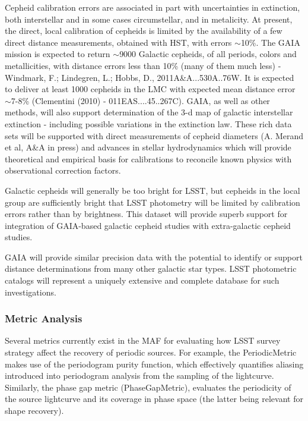 Cepheid calibration errors are associated in part with uncertainties in
extinction, both interstellar and in some cases circumstellar, and in
metalicity.  At present, the direct, local calibration of cepheids is limited
by the availability of a few direct distance measurements, obtained with HST,
with errors $\sim$10\%.  The GAIA mission is expected to return $\sim$9000
Galactic cepheids, of all periods, colors and metallicities, with distance
errors less than 10\% (many of them much less) - Windmark, F.; Lindegren, L.;
Hobbs, D., 2011A\&A...530A..76W. It is expected to deliver at least 1000
cepheids in the LMC with expected mean distance error $\sim$7-8\% (Clementini
(2010) - 011EAS....45..267C).  GAIA, as well as other methods, will also
support determination of the 3-d map of galactic interstellar extinction -
including possible variations in the extinction law. These rich data sets will
be supported with direct measurements of cepheid diameters (A. Merand et al,
A\&A in press) and advances in stellar hydrodynamics
\citep{2013MNRAS.435.3191M} which will provide theoretical and empirical basis
for calibrations to reconcile known physics with observational correction
factors.

Galactic cepheids will generally be too bright for LSST, but cepheids in
the local group are sufficiently bright that LSST photometry will be
limited by calibration errors rather than by brightness.  This dataset
will provide superb support for integration of GAIA-based galactic
cepheid studies with extra-galactic cepheid studies.

GAIA will provide similar precision data with the potential to identify
or support distance determinations from many other galactic star types.
LSST photometric catalogs will represent a uniquely extensive and
complete database for such investigations.


\subsubsection{Metric Analysis}
\label{sec:\secname:analysis}

Several metrics currently exist in the MAF for evaluating how LSST
survey strategy affect the recovery of periodic sources.
For example,
the PeriodicMetric makes use of the periodogram purity function, which effectively
quantifies aliasing introduced into periodogram analysis from the
sampling of the lightcurve.
%
%
Similarly, the
phase gap metric (PhaseGapMetric),
evaluates the periodicity of the source lightcurve and its coverage
in phase space (the latter being relevant for shape recovery).

